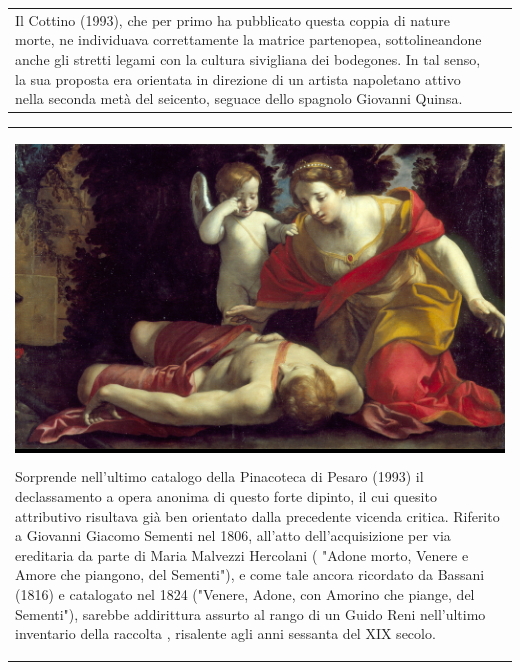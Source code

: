 \documentclass[hidelinks,12pt,a4paper,openright,twoside]{book}
\begin{document}
\begin{tabularx}{\linewidth}{XX}
{				\bigskip
				\newline
				\begin{minipage}{0.9\linewidth}
					\raggedright
					 Il Cottino (1993), che per primo ha pubblicato questa coppia di nature morte, ne individuava correttamente la matrice partenopea, sottolineandone anche gli stretti legami con la cultura sivigliana dei bodegones. In tal senso, la sua proposta era orientata in direzione di un artista napoletano attivo nella seconda metà del seicento, seguace dello spagnolo Giovanni Quinsa.
				\end{minipage}
		}
	\end{tabularx}

	\vspace{5mm}
	\nopagebreak
	\begin{tabularx}{\linewidth}{X}
		\begin{center}
			
			\hspace{25mm}
			\setdf{content={\textcolor{white}{\hspace{35mm} \Large \#15}}}
			\colorbox{black}{\includegraphics[scale=0.052]{Gessi_Giovan_Francesco-Morte_di_Adone.jpg}}
			\bigskip
			\newline
			\begin{minipage}{0.8\linewidth}
				\raggedright
				Sorprende nell'ultimo catalogo della Pinacoteca di Pesaro (1993) il declassamento a opera anonima di questo forte dipinto, il cui quesito attributivo risultava già ben orientato dalla precedente vicenda critica. Riferito a Giovanni Giacomo Sementi nel 1806, all'atto dell'acquisizione per via ereditaria da parte di Maria Malvezzi Hercolani ( "Adone morto, Venere e Amore che piangono, del Sementi"), e come tale ancora ricordato da Bassani (1816) e catalogato nel 1824 ("Venere, Adone, con Amorino che piange, del Sementi"), sarebbe addirittura assurto al rango di un Guido Reni nell'ultimo inventario della raccolta , risalente agli anni sessanta del XIX secolo.
			\end{minipage}
		\end{center}
	\end{tabularx}
	
\end{document}
